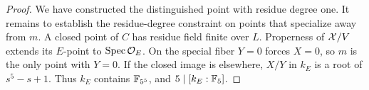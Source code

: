 \begin{proof}
We have constructed the distinguished point with residue degree one.
It remains to establish the residue-degree constraint on points that
specialize away from $m$.
A closed point of $C$ has residue field finite over $L$.
Properness of $\mathcal X/V$ extends its $E$-point to $\operatorname{Spec}\mathcal O_E$.
On the special fiber $Y=0$ forces $X=0$, so $m$ is the only
point with $Y=0$. If the closed image is elsewhere, $X/Y$ in
$k_E$ is a root of $s^5-s+1$. Thus $k_E$ contains $\mathbb F_{5^5}$,
and $5\mid[k_E:\mathbb F_5]$.
\end{proof}
